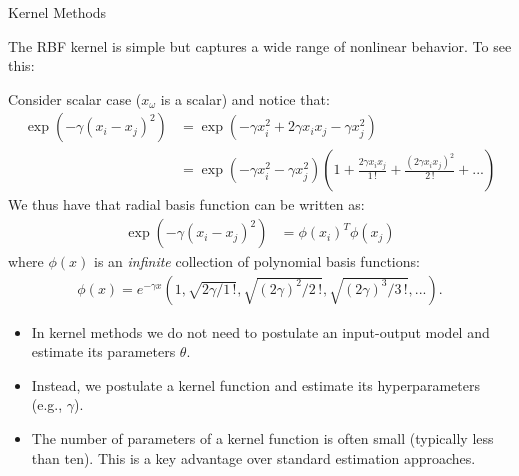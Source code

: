 \documentclass[9pt]{beamer}
\begin{document}
\begin{frame}{Kernel Methods}

The RBF kernel is simple but captures a wide range of nonlinear behavior. To see this:
\begin{block}{}
Consider scalar case ($x_\omega$ is a scalar) and notice that:
\begin{align*}
\exp(-\gamma(x_i-x_j)^2)&=\exp(-\gamma x_i^2+2\gamma x_ix_j-\gamma x_j^2)\\
&=\exp(-\gamma x_i^2-\gamma x_j^2)\left(1+\frac{2\gamma x_ix_j}{1\, !}+\frac{(2\gamma x_ix_j)^2}{2\,!}+...\right)
\end{align*}
We thus have that radial basis function can be written as:
\begin{align*}
\exp(-\gamma(x_i-x_j)^2)&=\phi(x_i)^T\phi(x_j)
\end{align*}
where $\phi(x)$ is an {\em infinite} collection of polynomial basis functions: 
\begin{align*}
\phi(x)=e^{-\gamma x}(1,\sqrt{2\gamma/1\,!},\sqrt{(2\gamma)^2/2\,!},\sqrt{(2\gamma)^3/3\,!},...). 
\end{align*}
\end{block}
\begin{itemize}
\item In kernel methods we do not need to postulate an input-output model and estimate its parameters $\theta$.  
\item Instead, we postulate a kernel function and estimate its hyperparameters (e.g., $\gamma$).  
\item The number of parameters of a kernel function is often small (typically less than ten). This is a key advantage over standard estimation approaches. 
\end{itemize}


\end{frame}

\end{document}
